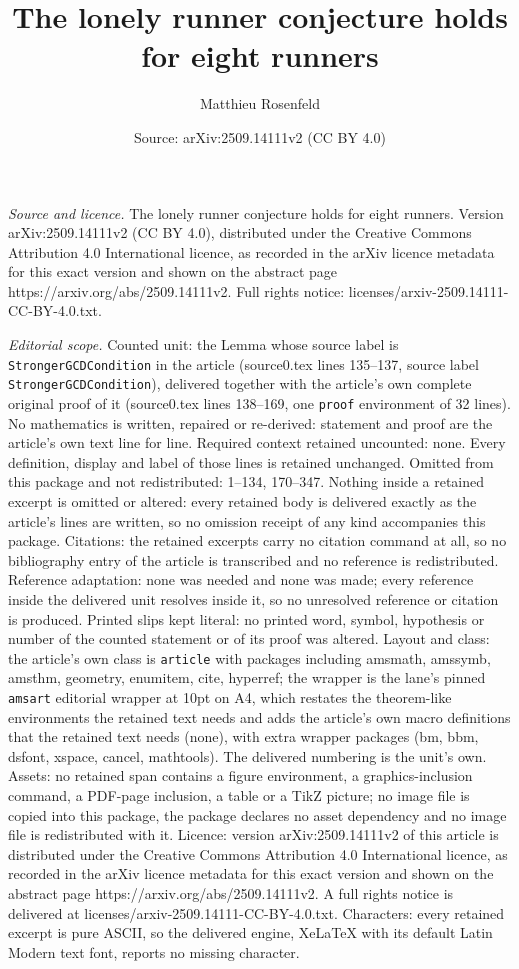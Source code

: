 \documentclass[10pt,a4paper]{amsart}
\title[The lonely runner conjecture holds for eight runners]{The lonely runner conjecture holds for eight runners}
\author{Matthieu Rosenfeld}
\date{Source: arXiv:2509.14111v2 (CC BY 4.0)}
\begin{document}
\maketitle

\noindent\emph{Source and licence.} The lonely runner conjecture holds for eight runners. Version arXiv:2509.14111v2 (CC BY 4.0), distributed under the Creative Commons Attribution 4.0 International licence, as recorded in the arXiv licence metadata for this exact version and shown on the abstract page https://arxiv.org/abs/2509.14111v2. Full rights notice: licenses/arxiv-2509.14111-CC-BY-4.0.txt.\par\smallskip

\noindent\textit{Editorial scope.} Counted unit: the Lemma whose source label is \texttt{StrongerGCDCondition} in the article (source0.tex lines 135--137, source label \texttt{StrongerGCDCondition}), delivered together with the article's own complete original proof of it (source0.tex lines 138--169, one \texttt{proof} environment of 32 lines). No mathematics is written, repaired or re-derived: statement and proof are the article's own text line for line. Required context retained uncounted: none. Every definition, display and label of those lines is retained unchanged. Omitted from this package and not redistributed: 1--134, 170--347. Nothing inside a retained excerpt is omitted or altered: every retained body is delivered exactly as the article's lines are written, so no omission receipt of any kind accompanies this package. Citations: the retained excerpts carry no citation command at all, so no bibliography entry of the article is transcribed and no reference is redistributed. Reference adaptation: none was needed and none was made; every reference inside the delivered unit resolves inside it, so no unresolved reference or citation is produced. Printed slips kept literal: no printed word, symbol, hypothesis or number of the counted statement or of its proof was altered. Layout and class: the article's own class is \texttt{article} with packages including amsmath, amssymb, amsthm, geometry, enumitem, cite, hyperref; the wrapper is the lane's pinned \texttt{amsart} editorial wrapper at 10pt on A4, which restates the theorem-like environments the retained text needs and adds the article's own macro definitions that the retained text needs (none), with extra wrapper packages (bm, bbm, dsfont, xspace, cancel, mathtools). The delivered numbering is the unit's own. Assets: no retained span contains a figure environment, a graphics-inclusion command, a PDF-page inclusion, a table or a TikZ picture; no image file is copied into this package, the package declares no asset dependency and no image file is redistributed with it. Licence: version arXiv:2509.14111v2 of this article is distributed under the Creative Commons Attribution 4.0 International licence, as recorded in the arXiv licence metadata for this exact version and shown on the abstract page https://arxiv.org/abs/2509.14111v2. A full rights notice is delivered at licenses/arxiv-2509.14111-CC-BY-4.0.txt. Characters: every retained excerpt is pure ASCII, so the delivered engine, XeLaTeX with its default Latin Modern text font, reports no missing character.
\end{document}
